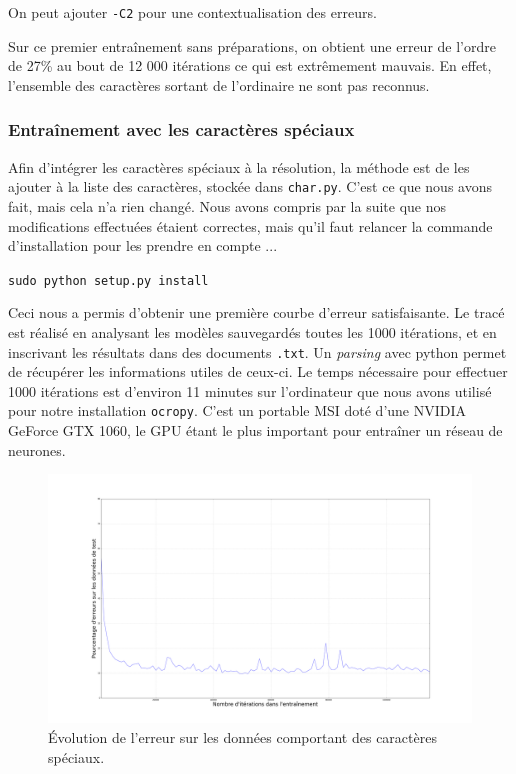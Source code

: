 \documentclass{report}
\begin{document}
On peut ajouter \texttt{-C2} pour une contextualisation des erreurs.

Sur ce premier entraînement sans préparations, on obtient une erreur de l'ordre de 27\% au bout de 12 000 itérations ce qui est extrêmement mauvais. En effet, l'ensemble des caractères sortant de l'ordinaire ne sont pas reconnus.

\subsubsection{Entraînement avec les caractères spéciaux}

Afin d'intégrer les caractères spéciaux à la résolution, la méthode est de les ajouter à la liste des caractères, stockée dans \texttt{char.py}. C'est ce que nous avons fait, mais cela n'a rien changé. Nous avons compris par la suite que nos modifications effectuées étaient correctes, mais qu'il faut relancer la commande d'installation pour les prendre en compte ...

\begin{center}
    \texttt{sudo python setup.py install}
\end{center}

Ceci nous a permis d'obtenir une première courbe d'erreur satisfaisante.
Le tracé est réalisé en analysant les modèles sauvegardés toutes les 1000 itérations, et en inscrivant les résultats dans des documents \texttt{.txt}.
Un \textit{parsing} avec python permet de récupérer les informations utiles de ceux-ci. 
Le temps nécessaire pour effectuer 1000 itérations est d'environ 11 minutes sur l'ordinateur que nous avons utilisé pour notre installation \texttt{ocropy}.
C'est un portable MSI doté d'une NVIDIA GeForce GTX 1060, le GPU étant le plus important pour entraîner un réseau de neurones.

\begin{figure}[!h] 
    \center
    \includegraphics[width=13cm]{error_default.png}
    \caption{Évolution de l'erreur sur les données comportant des caractères spéciaux.}
    \label{err_default}
\end{figure}
\end{document}

